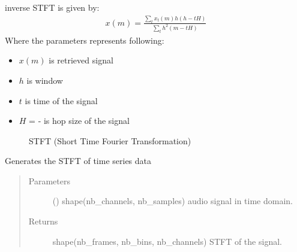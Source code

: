 \documentclass[letterpaper,10pt,english,openany,oneside]{sphinxmanual}
\begin{document}
\begin{fulllineitems}
\begin{fulllineitems}
inverse STFT is given by:
\begin{equation*}
\begin{split}x(m) = \frac{ \sum_{t}x_{t}(m)h(h-tH) }{ \sum_{t} h^{2}(m-tH) }\end{split}
\end{equation*}
Where the parameters represents following:
\begin{itemize}
\item {} 
\(x(m)\) is retrieved signal

\item {} 
\(h\) is window

\item {} 
\(t\) is time of the signal

\item {} 
\(H\) =  -  is hop size of the signal

\end{itemize}



\begin{description}
\item[{{\hyperref[\detokenize{docs/source/preprocess:preprocess.preprocess_tools.STFT.stft}]{}}}] \leavevmode
STFT (Short Time Fourier Transformation)

\end{description}



\end{fulllineitems}


\begin{fulllineitems}
\label{\detokenize{docs/source/preprocess:preprocess.preprocess_tools.STFT.stft}}
Generates the STFT of time series data
\begin{quote}\begin{description}
\item[{Parameters}] \leavevmode
{} () \textendash{} shape(nb\_channels, nb\_samples)
audio signal in time domain.

\item[{Returns}] \leavevmode
{} \textendash{} shape(nb\_frames, nb\_bins, nb\_channels)
STFT of the signal.


\end{description}
\end{quote}
\end{fulllineitems}
\end{fulllineitems}
\end{document}
